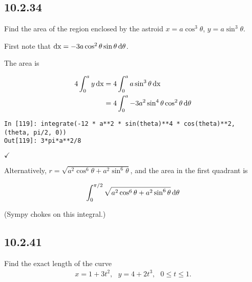 \documentclass[12pt]{article}
\begin{document}
\subsection*{10.2.34}
Find the area of the region enclosed by the astroid $x = a\cos^3 \theta$,
$y = a \sin^3\theta$.

\begin{mdframed}
  First note that $\operatorname{\text{dx}} = -3a\cos^2 \theta \sin\theta \operatorname{\text{d}\theta}$.

  The area is

  \begin{align*}
    4\int_0^a y \operatorname{\text{dx}}
    &= 4\int_0^a a \sin^3\theta \operatorname{\text{dx}} \\
    &= 4\int_0^a -3a^2 \sin^4\theta \cos^2\theta \operatorname{\text{d}\theta} \\
  \end{align*}

\begin{verbatim}
In [119]: integrate(-12 * a**2 * sin(theta)**4 * cos(theta)**2, (theta, pi/2, 0))
Out[119]: 3*pi*a**2/8
\end{verbatim}

$\checkmark$

  Alternatively, $r = \sqrt{a^2\cos^6\theta + a^2\sin^6\theta}$, and the area
  in the first quadrant is

  \begin{align*}
    \int_0^{\pi/2} \sqrt{a^2\cos^6\theta + a^2\sin^6\theta} \operatorname{\text{d}\theta} \\
  \end{align*}

(Sympy chokes on this integral.)

\end{mdframed}

\subsection*{10.2.41}
Find the exact length of the curve
\begin{align*}
  x = 1 + 3t^2, ~~~ y = 4 + 2t^3, ~~~ 0 \leq t \leq 1.
\end{align*}
\end{document}

